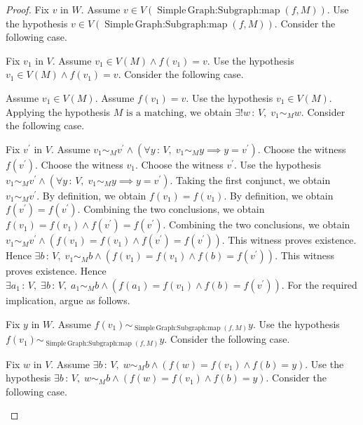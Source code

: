 \documentclass{article}
\theoremstyle{paperresult}
\newenvironment{proofstep}{\par\smallskip\ifdim\leftskip<3em\relax\advance\leftskip by 1em\relax\fi\noindent\ignorespaces}{\par\smallskip}
\begin{document}
\begin{proof}
Fix \(v\) in \(W\).
Assume \(v \in V(\operatorname{Simple\,Graph\mathord{:}Subgraph\mathord{:}map}\left(f, M\right))\).
Use the hypothesis \(v \in V(\operatorname{Simple\,Graph\mathord{:}Subgraph\mathord{:}map}\left(f, M\right))\).
Consider the following case.
\begin{proofstep}
Fix \(v_{1}\) in \(V\).
Assume \(v_{1} \in V(M) \land f(v_{1}) = v\).
Use the hypothesis \(v_{1} \in V(M) \land f(v_{1}) = v\).
Consider the following case.
\begin{proofstep}
Assume \(v_{1} \in V(M)\).
Assume \(f(v_{1}) = v\).
Use the hypothesis \(v_{1} \in V(M)\).
Applying the hypothesis \(M\text{ is a matching}\), we obtain \(\exists! w\, :\, V,\; v_{1} \sim_{M} w\).
Consider the following case.
\begin{proofstep}
Fix \(v^{'}\) in \(V\).
Assume \(v_{1} \sim_{M} v^{'} \land \left(\forall y\, :\, V,\; v_{1} \sim_{M} y \implies y = v^{'}\right)\).
Choose the witness \(f(v^{'})\).
Choose the witness \(v_{1}\).
Choose the witness \(v^{'}\).
Use the hypothesis \(v_{1} \sim_{M} v^{'} \land \left(\forall y\, :\, V,\; v_{1} \sim_{M} y \implies y = v^{'}\right)\).
Taking the first conjunct, we obtain \(v_{1} \sim_{M} v^{'}\).
By definition, we obtain \(f(v_{1}) = f(v_{1})\).
By definition, we obtain \(f(v^{'}) = f(v^{'})\).
Combining the two conclusions, we obtain \(f(v_{1}) = f(v_{1}) \land f(v^{'}) = f(v^{'})\).
Combining the two conclusions, we obtain \(v_{1} \sim_{M} v^{'} \land \left(f(v_{1}) = f(v_{1}) \land f(v^{'}) = f(v^{'})\right)\).
This witness proves existence. Hence \(\exists b\, :\, V,\; v_{1} \sim_{M} b \land \left(f(v_{1}) = f(v_{1}) \land f(b) = f(v^{'})\right)\).
This witness proves existence. Hence \(\exists a_{1}\, :\, V,\; \exists b\, :\, V,\; a_{1} \sim_{M} b \land (f(a_{1}) = f(v_{1}) \land f(b) = f(v^{'}))\).
For the required implication, argue as follows.
\begin{proofstep}
Fix \(y\) in \(W\).
Assume \(f(v_{1}) \sim_{\operatorname{Simple\,Graph\mathord{:}Subgraph\mathord{:}map}\left(f, M\right)} y\).
Use the hypothesis \(f(v_{1}) \sim_{\operatorname{Simple\,Graph\mathord{:}Subgraph\mathord{:}map}\left(f, M\right)} y\).
Consider the following case.
\begin{proofstep}
Fix \(w\) in \(V\).
Assume \(\exists b\, :\, V,\; w \sim_{M} b \land \left(f(w) = f(v_{1}) \land f(b) = y\right)\).
Use the hypothesis \(\exists b\, :\, V,\; w \sim_{M} b \land \left(f(w) = f(v_{1}) \land f(b) = y\right)\).
Consider the following case.
\begin{proofstep}

\end{proofstep}
\end{proofstep}
\end{proofstep}
\end{proofstep}
\end{proofstep}
\end{proofstep}
\end{proof}
\end{document}
